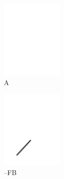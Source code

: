 \documentclass[12pt,twoside]{reedthesis}
\begin{document}
	\begin{figure}[H]
	\begin{subfigure}{0.25\textwidth}
		\centering
		\includegraphics[height=0.8\textwidth]{Images/A0}
		\caption{A}
		\label {A0}
	\end{subfigure}%
	\begin{subfigure}{0.25\textwidth}
		\centering
		\includegraphics[height=0.8\textwidth]{Images/A1}
		\caption{–FB}
		\label {A1}
	\end{subfigure}%
	\begin{subfigure}{0.25\textwidth}
		\centering

\end{subfigure}
\end{figure}
\end{document}
